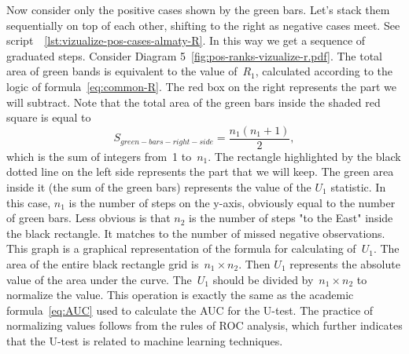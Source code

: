 \documentclass[]{scrreprt}
\begin{document}
Now consider only the positive cases shown by the green bars. Let's stack them sequentially on top of each other, shifting to the right as negative cases meet. See script~~\ref{lst:vizualize-pos-cases-almaty-R}. In this way we get a sequence of graduated steps. Consider Diagram 5~\ref{fig:pos-ranks-vizualize-r.pdf}. The total area of green bands is equivalent to the value of~$R_{1}$, calculated according to the logic of formula~\ref{eq:common-R}. The red box on the right represents the part we will subtract. Note that the total area of the green bars inside the shaded red square is equal to
\begin{equation}\label{eq:R-1}
S_{green-bars-right-side}=\frac{n_{1}(n_{1}+1)}{2},
\end{equation}
which is the sum of integers from~1 to~$n_{1}$. The rectangle highlighted by the black dotted line on the left side represents the part that we will keep. The green area inside it (the sum of the green bars) represents the value of the $U_{1}$ statistic. In this case, $n_{1}$ is the number of steps on the y-axis, obviously equal to the number of green bars. Less obvious is that $n_{2}$ is the number of steps "to the East" inside the black rectangle. It matches to the number of missed negative observations. This graph is a graphical representation of the formula for calculating of~$U_{1}$. The area of the entire black rectangle grid is~$n_{1} \times n_{2}$. Then $U_{1}$ represents the absolute value of the area under the curve. The~$U_{1}$ should be divided by~$n_{1} \times n_{2}$ to normalize the value. This operation is exactly the same as the academic formula~\ref{eq:AUC} used to calculate the AUC for the U-test. The practice of normalizing values follows from the rules of ROC analysis, which further indicates that the U-test is related to machine learning techniques.
\end{document}
